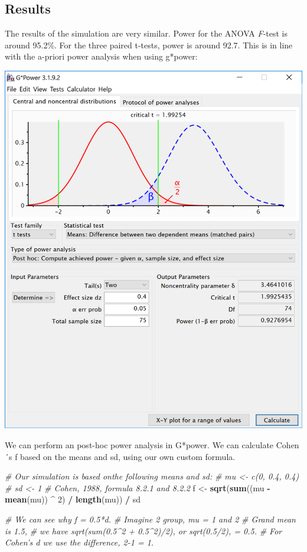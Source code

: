 \documentclass[]{book}
\newenvironment{Shaded}{\begin{snugshade}}{\end{snugshade}}
\newcommand{\CommentTok}[1]{\textcolor[rgb]{0.56,0.35,0.01}{\textit{#1}}}
\newcommand{\DecValTok}[1]{\textcolor[rgb]{0.00,0.00,0.81}{#1}}
\newcommand{\KeywordTok}[1]{\textcolor[rgb]{0.13,0.29,0.53}{\textbf{#1}}}
\newcommand{\NormalTok}[1]{#1}
\newcommand{\OperatorTok}[1]{\textcolor[rgb]{0.81,0.36,0.00}{\textbf{#1}}}
\newcommand{\StringTok}[1]{\textcolor[rgb]{0.31,0.60,0.02}{#1}}
\begin{document}
\hypertarget{results}{%
\subsection{Results}\label{results}}

The results of the simulation are very similar. Power for the ANOVA \emph{F}-test is around 95.2\%. For the three paired t-tests, power is around 92.7. This is in line with the a-priori power analysis when using g*power:

\includegraphics{screenshots/gpower_2.png}

We can perform an post-hoc power analysis in G*power. We can calculate Cohen´s f based on the means and sd, using our own custom formula.

\begin{Shaded}
\begin{Highlighting}[]
\CommentTok{# Our simulation is based onthe following means and sd:}
\CommentTok{# mu <- c(0, 0.4, 0.4)}
\CommentTok{# sd <- 1}
\CommentTok{# Cohen, 1988, formula 8.2.1 and 8.2.2}
\NormalTok{f <-}\StringTok{ }\KeywordTok{sqrt}\NormalTok{(}\KeywordTok{sum}\NormalTok{((mu }\OperatorTok{-}\StringTok{ }\KeywordTok{mean}\NormalTok{(mu)) }\OperatorTok{^}\StringTok{ }\DecValTok{2}\NormalTok{) }\OperatorTok{/}\StringTok{ }\KeywordTok{length}\NormalTok{(mu)) }\OperatorTok{/}\StringTok{ }\NormalTok{sd }

\CommentTok{# We can see why f = 0.5*d.}
\CommentTok{# Imagine 2 group, mu = 1 and 2}
\CommentTok{# Grand mean is 1.5, }
\CommentTok{# we have sqrt(sum(0.5^2 + 0.5^2)/2), or sqrt(0.5/2), = 0.5.}
\CommentTok{# For Cohen's d we use the difference, 2-1 = 1. }
\end{Highlighting}
\end{Shaded}
\end{document}
